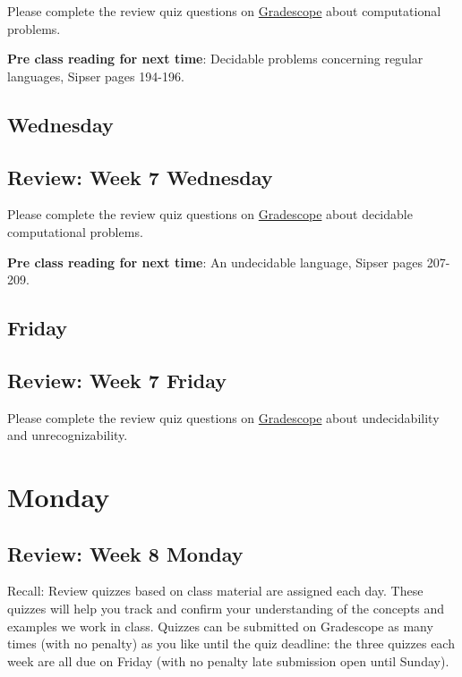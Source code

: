 Please complete the review quiz questions on \href{http://gradescope.com}{Gradescope} about 
computational problems.

{\bf Pre class reading for next time}: Decidable problems concerning regular languages, Sipser pages 194-196.


\newpage
\subsection*{Wednesday}



\subsection*{Review: Week 7 Wednesday}

Please complete the review quiz questions on \href{http://gradescope.com}{Gradescope} about 
decidable computational problems.

{\bf Pre class reading for next time}: An undecidable language, Sipser pages 207-209.



\newpage
\subsection*{Friday}



\newpage
\subsection*{Review: Week 7 Friday}


Please complete the review quiz questions on \href{http://gradescope.com}{Gradescope} about 
undecidability and unrecognizability.

\newpage

\section*{Monday}


    
\newpage
\subsection*{Review: Week 8 Monday}


Recall: Review quizzes based on class material are assigned each day. 
These quizzes will help you track and confirm your understanding of the concepts and examples 
we work in class. Quizzes can be submitted on Gradescope as many times (with no penalty) as 
you like until the quiz deadline: the three quizzes each week are all due on Friday (with no penalty 
late submission open until Sunday).

